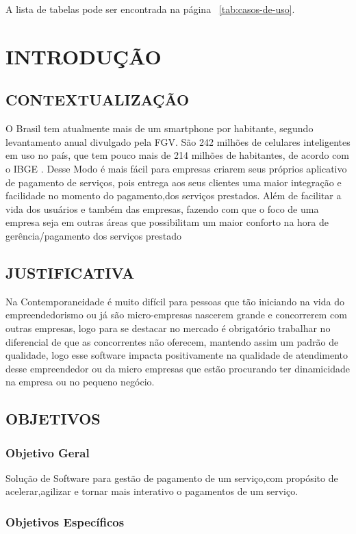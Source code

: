 \documentclass[a4paper,12pt]{article}
\begin{document}
\listoffigures
\clearpage
\listoftables
A lista de tabelas pode ser encontrada na página~ \ref{tab:casos-de-uso}.
\clearpage
\section{INTRODUÇÃO}
\subsection{CONTEXTUALIZAÇÃO}
O Brasil tem atualmente mais de um smartphone por habitante, segundo levantamento anual divulgado pela FGV. São 242 milhões de celulares inteligentes em uso no país, que tem pouco mais de 214 milhões de habitantes, de acordo com o IBGE \cite{celulares}.
Desse Modo é mais fácil para empresas criarem seus próprios aplicativo de pagamento de serviços, pois entrega aos seus clientes uma maior integração e facilidade no momento do pagamento,dos serviços prestados.
Além de facilitar a vida dos usuários e também das empresas, fazendo com que o foco de uma empresa seja em outras áreas que possibilitam um maior conforto na hora de gerência/pagamento dos serviços prestado
\subsection{JUSTIFICATIVA}
Na Contemporaneidade  é muito difícil para pessoas que tão iniciando na vida do empreendedorismo ou já são micro-empresas nascerem grande e concorrerem com outras empresas, logo para se destacar no mercado é obrigatório trabalhar no diferencial de que as  concorrentes não oferecem, mantendo assim um padrão de qualidade, logo esse software impacta positivamente na qualidade de atendimento desse empreendedor ou da micro empresas que estão procurando ter dinamicidade na empresa ou no pequeno negócio.
\subsection{OBJETIVOS}
\subsubsection{Objetivo Geral}
Solução de Software para gestão de pagamento de um serviço,com propósito de acelerar,agilizar e tornar mais interativo o pagamentos de um serviço.
\subsubsection{Objetivos Específicos}
\end{document}
